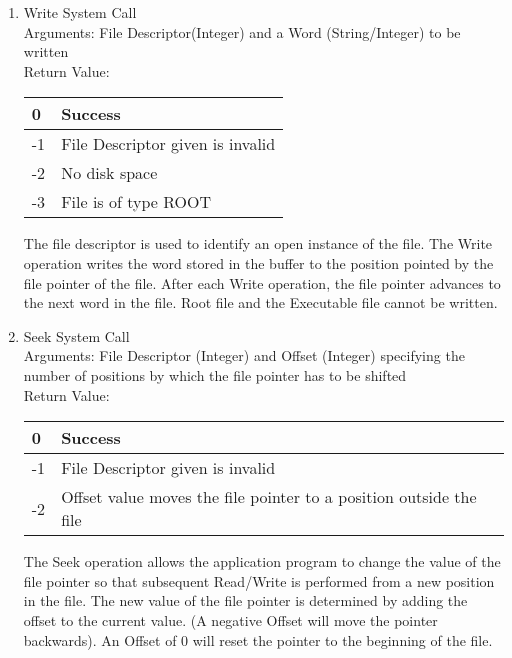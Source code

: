 \begin{enumerate}
\item{Write System Call}\\
Arguments: File Descriptor(Integer) and a Word (String/Integer) to be written\\
Return Value:
\FloatBarrier \begin{table}[H]
\centering
\begin{tabular}{|l|l|}
\hline
0  & Success           \\ \hline
-1 & File Descriptor given is invalid  \\ \hline
-2 & No disk space \\ \hline
-3 & File is of type ROOT \\ \hline
\end{tabular}
\end{table} \FloatBarrier 

The file descriptor is used to identify an open instance of the file. The Write operation writes the word stored in the buffer to the position pointed by the file pointer of the file. After each Write operation, the file pointer advances to the next word in the file. Root file and the Executable file cannot be written.

\item{Seek System Call}\\
Arguments: File Descriptor (Integer) and Offset (Integer) specifying the number of positions by which the file pointer has to be shifted\\
Return Value:
\FloatBarrier \begin{table}[H]
\centering
\begin{tabular}{|l|l|}
\hline
0  & Success           \\ \hline
-1 & File Descriptor given is invalid  \\ \hline
-2 & Offset value moves the file pointer to a position outside the file \\ \hline
\end{tabular}
\end{table} \FloatBarrier 

The Seek operation allows the application program to change the value of the file pointer so that subsequent Read/Write is performed from a new position in the file. The new value of the file pointer is determined by adding the offset to the current value. (A negative Offset will move the pointer backwards). An Offset of 0 will reset the pointer to the beginning of the file. 
\end{enumerate}

